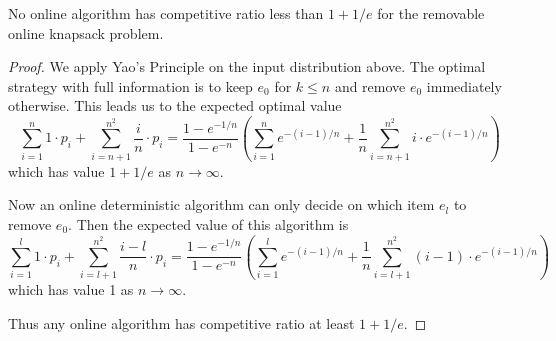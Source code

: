 \begin{theorem}
	\emph{\cite{han}}
	No online algorithm has competitive ratio less than $1+1/e$ for the removable online knapsack problem.
\end{theorem}
\begin{proof}
	We apply Yao's Principle on the input distribution above. The optimal strategy with full information is to keep $e_0$ for $k\le n$ and remove $e_0$ immediately otherwise. This leads us to the expected optimal value
	\[ \sum_{i=1}^n 1\cdot p_i + \sum_{i=n+1}^{n^2} \frac{i}{n}\cdot p_i = \frac{1-e^{-1/n}}{1-e^{-n}} \left( \sum_{i=1}^n e^{-(i-1)/n} + \frac{1}{n} \sum_{i=n+1}^{n^2} i\cdot e^{-(i-1)/n} \right) \]
	which has value $1+1/e$ as $n \rightarrow \infty$.

	Now an online deterministic algorithm can only decide on which item $e_l$ to remove $e_0$. Then the expected value of this algorithm is
	\[ \sum_{i=1}^l 1\cdot p_i + \sum_{i=l+1}^{n^2} \frac{i-l}{n}\cdot p_i = \frac{1-e^{-1/n}}{1-e^{-n}} \left( \sum_{i=1}^l e^{-(i-1)/n} + \frac{1}{n} \sum_{i=l+1}^{n^2} (i-1)\cdot e^{-(i-1)/n} \right) \]
which has value 1 as $n \rightarrow \infty$.

Thus any online algorithm has competitive ratio at least $1+1/e$.
\end{proof}



